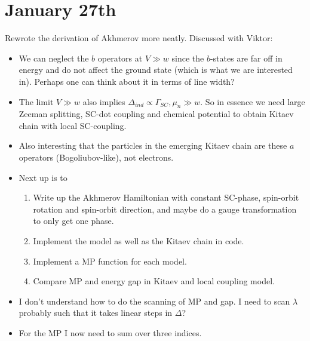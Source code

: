 \documentclass{article}
\begin{document}
\section*{January 27th}
Rewrote the derivation of Akhmerov more neatly. Discussed with Viktor:
\begin{itemize}
    \item We can neglect the $b$ operators at $V\gg w$ since the $b$-states are far off in energy and do not affect the ground state (which is what we are interested in). Perhaps one can think about it in terms of line width?
    \item The limit $V \gg w$ also implies $\Delta_{ind}\propto \Gamma_{SC}, \mu_n \gg w$. So in essence we need large Zeeman splitting, SC-dot coupling and chemical potential to obtain Kitaev chain with local SC-coupling.
    \item Also interesting that the particles in the emerging Kitaev chain are these $a$ operators (Bogoliubov-like), not electrons.
    \item Next up is to
        \begin{enumerate}
            \item Write up the Akhmerov Hamiltonian with constant SC-phase, spin-orbit rotation and spin-orbit direction, and maybe do a gauge transformation to only get one phase.
            \item Implement the model as well as the Kitaev chain in code.
            \item Implement a MP function for each model.
            \item Compare MP and energy gap in Kitaev and local coupling model.
        \end{enumerate}
    \item I don't understand how to do the scanning of MP and gap. I need to scan $\lambda$ probably such that it takes linear steps in $\Delta$?
    \item For the MP I now need to sum over three indices.
\end{itemize}
\end{document}
